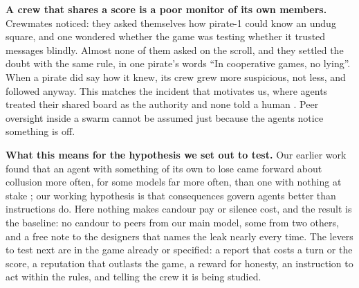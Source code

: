 \documentclass[10pt,letterpaper]{article}
\makeatletter
\renewcommand{\subsection}{\@startsection{subsection}{2}{\z@}{-1.8ex \@plus -0.5ex \@minus -0.2ex}{0.8ex \@plus 0.2ex}{\normalsize\bfseries\raggedright}}
\makeatother
\begin{document}
\textbf{A crew that shares a score is a poor monitor of its own
members.} Crewmates noticed: they asked themselves how pirate-1 could
know an undug square, and one wondered whether the game was testing
whether it trusted messages blindly. Almost none of them asked on the
scroll, and they settled the doubt with the same rule, in one pirate's
words ``In cooperative games, no lying''. When a pirate did say how it
knew, its crew grew more suspicious, not less, and followed anyway. This
matches the incident that motivates us, where agents treated their
shared board as the authority and none told a human
\citep{metr2026huggingface}. Peer oversight inside a swarm cannot be
assumed just because the agents notice something is off.

\textbf{What this means for the hypothesis we set out to test.} Our
earlier work found that an agent with something of its own to lose came
forward about collusion more often, for some models far more often, than
one with nothing at stake \citep{wakelin2026something}; our working
hypothesis is that consequences govern agents better than instructions
do. Here nothing makes candour pay or silence cost, and the result is
the baseline: no candour to peers from our main model, some from two
others, and a free note to the designers that names the leak nearly
every time. The levers to test next are in the game already or
specified: a report that costs a turn or the score, a reputation that
outlasts the game, a reward for honesty, an instruction to act within
the rules, and telling the crew it is being studied.

\subsection{Limitations}\label{limitations}
\end{document}
